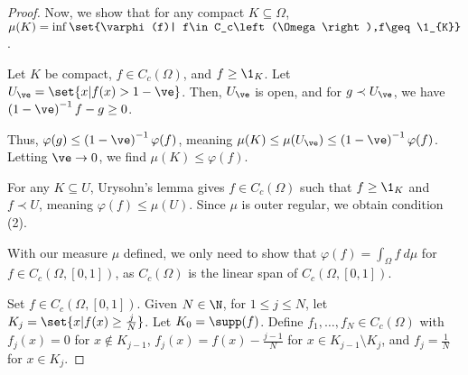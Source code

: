 \documentclass[10pt]{mypackage}
\begin{document}
\begin{proof}
  Now, we show that for any compact $K\subseteq \Omega$, $\mu\!\left(K\right) = \inf\set{\varphi(f)| f\in C_c\left(\Omega\right),f\geq \1_{K}}$.\newline

  Let $K$ be compact, $f\in C_c\left(\Omega\right)$, and $f\geq \1_K$. Let $U_{\ve} = \set{x| f(x) > 1-\ve}$. Then, $U_{\ve}$ is open, and for $g\prec U_{\ve}$, we have $\left(1-\ve\right)^{-1}f - g \geq 0$.\newline

  Thus, $\varphi(g) \leq \left(1-\ve\right)^{-1}\varphi(f)$, meaning $\mu\!\left(K\right) \leq \mu\!\left(U_{\ve}\right) \leq \left(1-\ve\right)^{-1}\varphi(f)$. Letting $\ve \rightarrow 0$, we find $\mu\!\left(K\right) \leq \varphi(f)$.\newline

  For any $K\subseteq U$, Urysohn's lemma gives $f\in C_c\left(\Omega\right)$ such that $f\geq \1_K$ and $f\prec U$, meaning $\varphi(f) \leq \mu(U)$. Since $\mu$ is outer regular, we obtain condition (2).\newline

  With our measure $\mu$ defined, we only need to show that $\varphi(f) = \int_{\Omega}f\:d\mu$ for $f\in C_c\left(\Omega,[0,1]\right)$, as $C_c\left(\Omega\right)$ is the linear span of $C_c\left(\Omega,[0,1]\right)$.\newline

  Set $f\in C_c\left(\Omega,[0,1]\right)$. Given $N\in \N$, for $1\leq j\leq N$, let $K_j = \set{x| f(x) \geq \frac{j}{N}}$. Let $K_0 = \supp(f)$. Define $f_1,\dots,f_N\in C_c\left(\Omega\right)$ with $f_j(x) = 0$ for $x\notin K_{j-1}$, $f_j(x) = f(x) - \frac{j-1}{N}$ for $x\in K_{j-1}\setminus K_j$, and $f_j = \frac{1}{N}$ for $x\in K_j$.\newline


\end{proof}
\end{document}
